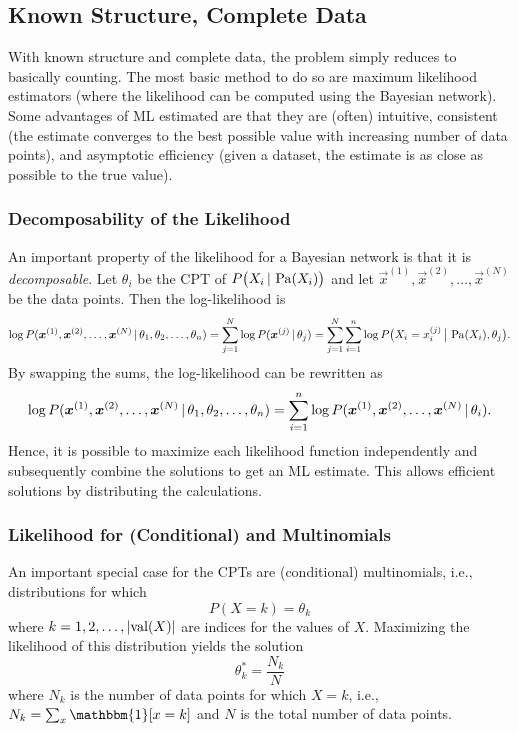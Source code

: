 		\subsection{Known Structure, Complete Data}
			With known structure and complete data, the problem simply reduces to basically counting. The most basic method to do so are maximum likelihood estimators (where the likelihood can be computed using the Bayesian network). Some advantages of ML estimated are that they are (often) intuitive, consistent (the estimate converges to the best possible value with increasing number of data points), and asymptotic efficiency (given a dataset, the estimate is as close as possible to the true value).

			\subsubsection{Decomposability of the Likelihood}
				An important property of the likelihood for a Bayesian network is that it is \emph{decomposable}. Let \( \theta_i \) be the CPT of \( P\bigl(X_i \,\vert\, \operatorname{Pa}(X_i) \bigr) \) and let \( \vec{x}^{(1)}, \vec{x}^{(2)}, \dots, \vec{x}^{(N)} \) be the data points. Then the log-likelihood is
				\begin{equation}
					\log P(\bm{x}^{(1)}, \bm{x}^{(2)}, \dots, \bm{x}^{(N)} \,\vert\, \theta_1, \theta_2, \dots, \theta_n)
					= \sum_{j = 1}^{N} \log P(\bm{x}^{(j)} \,\vert\, \theta_j)
					= \sum_{j = 1}^{N} \sum_{i = 1}^{n} \log P\bigl(X_i = x_i^{(j)} \,\big\vert\, \operatorname{Pa}(X_i), \theta_j \bigr).
				\end{equation}
				By swapping the sums, the log-likelihood can be rewritten as
				\begin{equation}
					\log P(\bm{x}^{(1)}, \bm{x}^{(2)}, \dots, \bm{x}^{(N)} \,\vert\, \theta_1, \theta_2, \dots, \theta_n)
					= \sum_{i = 1}^{n} \log P(\bm{x}^{(1)}, \bm{x}^{(2)}, \dots, \bm{x}^{(N)} \,\vert\, \theta_i).
				\end{equation}
				Hence, it is possible to maximize each likelihood function independently and subsequently combine the solutions to get an ML estimate. This allows efficient solutions by distributing the calculations.

			\subsubsection{Likelihood for (Conditional) and Multinomials}
				An important special case for the CPTs are (conditional) multinomials, i.e., distributions for which
				\begin{equation}
					P(X = k) = \theta_k
				\end{equation}
				where \( k = 1, 2, \dots, \lvert \operatorname{val}(X) \rvert \) are indices for the values of \(X\). Maximizing the likelihood of this distribution yields the solution
				\begin{equation}
					\theta_k^\ast = \frac{N_k}{N}
				\end{equation}
				where \( N_k \) is the number of data points for which \( X = k \), i.e., \( N_k = \sum_x \mathbbm{1}[x = k] \) and \(N\) is the total number of data points.

